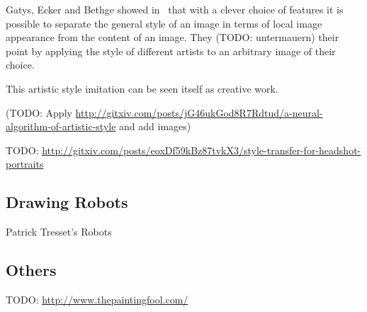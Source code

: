 Gatys, Ecker and Bethge showed in~\cite{gatys2015neural} that with a clever
choice of features it is possible to separate the general style of an image in
terms of local image appearance from the content of an image. They (TODO:
untermauern) their point by applying the style of different artists to an
arbitrary image of their choice.

This artistic style imitation can be seen itself as creative work.

(TODO: Apply \href{http://gitxiv.com/posts/jG46ukGod8R7Rdtud/a-neural-algorithm-of-artistic-style}{http://gitxiv.com/posts/jG46ukGod8R7Rdtud/a-neural-algorithm-of-artistic-style} and add images)



TODO: \cite{shih2014style} \href{http://gitxiv.com/posts/eoxDf59kBz87tvkX3/style-transfer-for-headshot-portraits}{http://gitxiv.com/posts/eoxDf59kBz87tvkX3/style-transfer-for-headshot-portraits}

\subsection{Drawing Robots}
Patrick Tresset's Robots

\subsection{Others}

TODO: \href{http://www.thepaintingfool.com/}{http://www.thepaintingfool.com/}